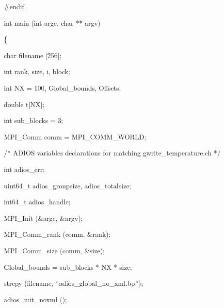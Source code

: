 \vspace{10pt}
\#endif

\vspace{23pt}
int main (int argc, char ** argv)

\vspace{10pt}
\{

\vspace{10pt}
\parindent=28pt
char        filename [256];

\vspace{10pt}
int         rank, size, i, block;

\vspace{10pt}
\parindent=57pt
int         NX = 100, Global\_bounds, Offsets;

\vspace{10pt}
\parindent=28pt
double      t[NX];

\vspace{10pt}
int         sub\_blocks = 3;

\vspace{10pt}
\parindent=57pt
MPI\_Comm    comm = MPI\_COMM\_WORLD;

\vspace{23pt}
\parindent=28pt
/* ADIOS variables declarations for matching gwrite\_temperature.ch */

\vspace{10pt}
int         adios\_err;

\vspace{10pt}
\parindent=57pt
uint64\_t    adios\_groupsize, adios\_totalsize;

\vspace{10pt}
\parindent=28pt
int64\_t     adios\_handle;

\vspace{23pt}
MPI\_Init (\&argc, \&argv);

\vspace{10pt}
\parindent=57pt
MPI\_Comm\_rank (comm, \&rank);

\vspace{10pt}
\parindent=28pt
MPI\_Comm\_size (comm, \&size);

\vspace{23pt}
Global\_bounds = sub\_blocks * NX * size;

\vspace{23pt}
\parindent=57pt
strcpy (filename, \texttt{"}adios\_global\_no\_xml.bp\texttt{"});

\vspace{23pt}
\parindent=28pt
adios\_init\_noxml ();

